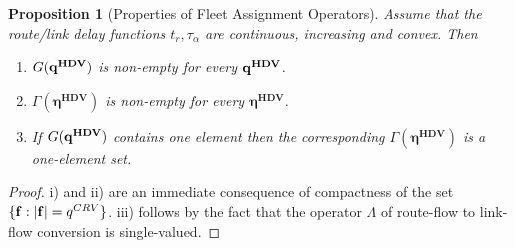 \documentclass[a4paper,11pt]{article}
\newtheorem{proposition}[theorem]{Proposition}
\begin{document}
\begin{proposition}[Properties of Fleet Assignment Operators]
Assume that the route/link delay functions $t_r, \tau_\alpha$ are continuous, increasing and convex. Then 
\begin{enumerate}
\item [i)] $G(\bold{q^{HDV}})$ is non-empty for every $\bold{q^{HDV}}$. 
\item [ii)] $\Gamma(\boldsymbol{\eta^{HDV}})$ is non-empty for every $\boldsymbol{\eta^{HDV}}$. 
\item [iii)] If $G(\bold{q^{HDV}})$ contains one element then the corresponding $\Gamma(\boldsymbol{\eta^{HDV}})$ is a one-element set. 
\end{enumerate}
\end{proposition}

\begin{proof}
i) and ii) are an immediate consequence of compactness of the set $\{\bold{f} : |\bold{f}| = q^{CRV} \}$. iii) follows by the fact that the operator $\Lambda$ of route-flow to link-flow conversion is single-valued.
\end{proof}
\end{document}
